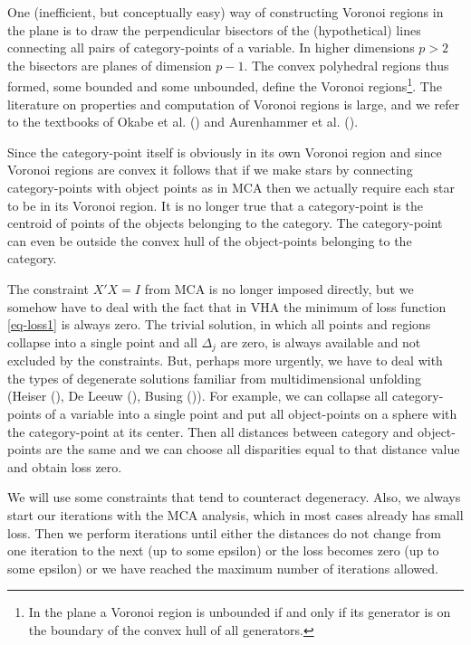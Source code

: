 \documentclass[
  12pt,
  letterpaper,
  DIV=11,
  numbers=noendperiod]{scrartcl}
\begin{document}
One (inefficient, but conceptually easy) way of constructing Voronoi
regions in the plane is to draw the perpendicular bisectors of the
(hypothetical) lines connecting all pairs of category-points of a
variable. In higher dimensions \(p > 2\) the bisectors are planes of
dimension \(p - 1\). The convex polyhedral regions thus formed, some
bounded and some unbounded, define the Voronoi
regions\footnote{In the plane a Voronoi region is unbounded if and only if its generator is on the boundary of the convex hull of all generators.}.
The literature on properties and computation of Voronoi regions is
large, and we refer to the textbooks of Okabe et al.
() and Aurenhammer et
al. ().

Since the category-point itself is obviously in its own Voronoi region
and since Voronoi regions are convex it follows that if we make stars by
connecting category-points with object points as in MCA then we actually
require each star to be in its Voronoi region. It is no longer true that
a category-point is the centroid of points of the objects belonging to
the category. The category-point can even be outside the convex hull of
the object-points belonging to the category.

The constraint \(X'X = I\) from MCA is no longer imposed directly, but
we somehow have to deal with the fact that in VHA the minimum of loss
function \eqref{eq-loss1} is always zero. The trivial solution, in which
all points and regions collapse into a single point and all \(\Delta_j\)
are zero, is always available and not excluded by the constraints. But,
perhaps more urgently, we have to deal with the types of degenerate
solutions familiar from multidimensional unfolding (Heiser
(), De Leeuw
(), Busing
()). For example, we can collapse all
category-points of a variable into a single point and put all
object-points on a sphere with the category-point at its center. Then
all distances between category and object-points are the same and we can
choose all disparities equal to that distance value and obtain loss
zero.

We will use some constraints that tend to counteract degeneracy. Also,
we always start our iterations with the MCA analysis, which in most
cases already has small loss. Then we perform iterations until either
the distances do not change from one iteration to the next (up to some
epsilon) or the loss becomes zero (up to some epsilon) or we have
reached the maximum number of iterations allowed.
\end{document}
